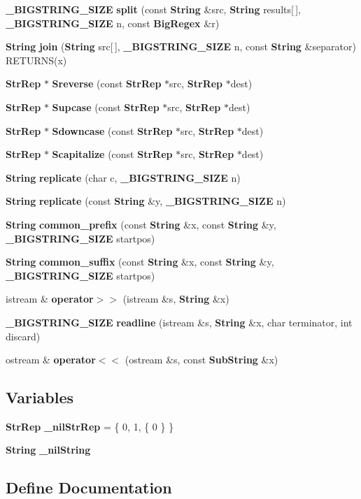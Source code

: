 \begin{CompactItemize}
\item 
{\bf \_\-BIGSTRING\_\-SIZE} {\bf split} (const {\bf String} \&src, {\bf String} results[$\,$], {\bf \_\-BIGSTRING\_\-SIZE} n, const {\bf Big\-Regex} \&r)
\item 
{\bf String} {\bf join} ({\bf String} src[$\,$], {\bf \_\-BIGSTRING\_\-SIZE} n, const {\bf String} \&separator) RETURNS(x)
\item 
{\bf Str\-Rep} $\ast$ {\bf Sreverse} (const {\bf Str\-Rep} $\ast$src, {\bf Str\-Rep} $\ast$dest)
\item 
{\bf Str\-Rep} $\ast$ {\bf Supcase} (const {\bf Str\-Rep} $\ast$src, {\bf Str\-Rep} $\ast$dest)
\item 
{\bf Str\-Rep} $\ast$ {\bf Sdowncase} (const {\bf Str\-Rep} $\ast$src, {\bf Str\-Rep} $\ast$dest)
\item 
{\bf Str\-Rep} $\ast$ {\bf Scapitalize} (const {\bf Str\-Rep} $\ast$src, {\bf Str\-Rep} $\ast$dest)
\item 
{\bf String} {\bf replicate} (char c, {\bf \_\-BIGSTRING\_\-SIZE} n)
\item 
{\bf String} {\bf replicate} (const {\bf String} \&y, {\bf \_\-BIGSTRING\_\-SIZE} n)
\item 
{\bf String} {\bf common\_\-prefix} (const {\bf String} \&x, const {\bf String} \&y, {\bf \_\-BIGSTRING\_\-SIZE} startpos)
\item 
{\bf String} {\bf common\_\-suffix} (const {\bf String} \&x, const {\bf String} \&y, {\bf \_\-BIGSTRING\_\-SIZE} startpos)
\item 
istream \& {\bf operator$>$$>$} (istream \&s, {\bf String} \&x)
\item 
{\bf \_\-BIGSTRING\_\-SIZE} {\bf readline} (istream \&s, {\bf String} \&x, char terminator, int discard)
\item 
ostream \& {\bf operator$<$$<$} (ostream \&s, const {\bf Sub\-String} \&x)
\end{CompactItemize}
\subsection*{Variables}
\begin{CompactItemize}
\item 
{\bf Str\-Rep} {\bf \_\-nil\-Str\-Rep} = \{ 0, 1, \{ 0 \} \}
\item 
{\bf String} {\bf \_\-nil\-String}
\end{CompactItemize}


\subsection{Define Documentation}
